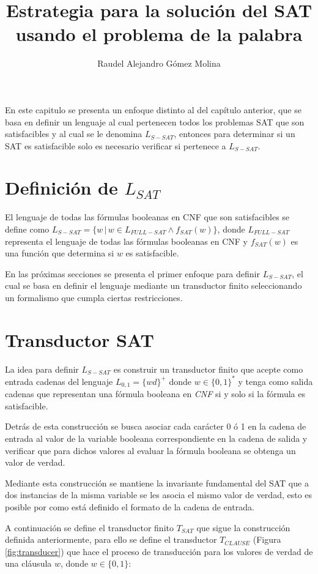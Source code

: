 \documentclass[12pt]{article}
\title{Estrategia para la solución del SAT usando el problema de la palabra}
\author{Raudel Alejandro Gómez Molina}
\begin{document}
\maketitle

En este capitulo se presenta un enfoque distinto al del capítulo anterior, que se basa en definir un lenguaje al cual
pertenecen todos los problemas SAT que son satisfacibles y al cual se le denomina $L_{S-SAT}$, entonces para determinar
si un SAT es satisfacible solo es necesario verificar si pertenece a $L_{S-SAT}$.

\section{Definición de $L_{SAT}$}

El lenguaje de todas las fórmulas booleanas en CNF que son satisfacibles se define como $L_{S-SAT}=\{w\,|\,w \in L_{FULL-SAT} \wedge f_{SAT}(w)\}$, 
donde $L_{FULL-SAT}$ representa el lenguaje de todas las fórmulas booleanas en CNF y $f_{SAT}(w)$ es una función que 
determina si $w$ es satisfacible.

En las próximas secciones se presenta el primer enfoque para definir $L_{S-SAT}$, el cual se basa en definir
el lenguaje mediante un transductor finito seleccionando un formalismo que cumpla ciertas restricciones. 

\section{Transductor SAT}

La idea para definir $L_{S-SAT}$ es construir un transductor finito que acepte como entrada cadenas del lenguaje $L_{0,1}=\{wd\}^+$ donde $w\in \{0,1\}^*$
y tenga como salida cadenas que representan una fórmula booleana en \textit{CNF}  si y solo si la fórmula es satisfacible. 

Detrás de esta construcción se busca asociar cada carácter 0 ó 1 en la cadena de entrada al valor de la variable booleana correspondiente en la cadena de salida y verificar que para dichos
valores al evaluar la fórmula booleana se obtenga un valor de verdad. 

Mediante esta construcción se mantiene la invariante fundamental del SAT que a dos instancias
de la misma variable se les asocia el mismo valor de verdad, esto es posible por como está definido el formato de la cadena de entrada.

A continuación se define el transductor finito $T_{SAT}$ que sigue la construcción definida anteriormente, para ello se define
el transductor $T_{CLAUSE}$ (Figura \ref{fig:transducer}) que hace el proceso de transducción para los valores de verdad de una cláusula $w$, donde $w\in \{0,1\}$:
\end{document}
